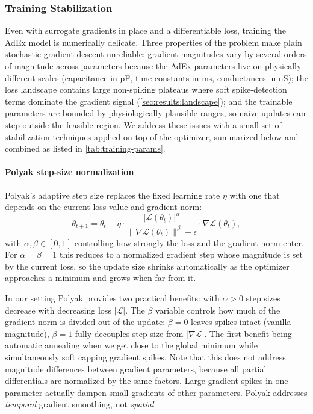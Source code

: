 \subsubsection{Training Stabilization}\label{sec:method:opt:stabilization}
Even with surrogate gradients in place and a differentiable loss, training the \gls{AdEx} model is numerically delicate.
Three properties of the problem make plain stochastic gradient descent unreliable:
gradient magnitudes vary by several orders of magnitude across parameters because the \gls{AdEx} parameters live on physically different scales (capacitance in pF, time constants in ms, conductances in nS);
the loss landscape contains large non-spiking plateaus where soft spike-detection terms dominate the gradient signal (\cref{sec:results:landscape});
and the trainable parameters are bounded by physiologically plausible ranges, so naive updates can step outside the feasible region.
We address these issues with a small set of stabilization techniques applied on top of the optimizer, summarized below and combined as listed in \cref{tab:training-params}.

\paragraph{Polyak step-size normalization}\label{sec:method:opt:stabilization:polyak}
Polyak's adaptive step size \cite{Polyak1964} replaces the fixed learning rate $\eta$ with one that depends on the current loss value and gradient norm:
\begin{equation}
    \theta_{t+1} = \theta_t - \eta \cdot \frac{|\mathcal{L}(\theta_t)|^{\alpha}}{\|\nabla \mathcal{L}(\theta_t)\|^{\beta} + \epsilon} \cdot \nabla \mathcal{L}(\theta_t),
\end{equation}
with $\alpha, \beta \in [0,1]$ controlling how strongly the loss and the gradient norm enter.
For $\alpha = \beta = 1$ this reduces to a normalized gradient step whose magnitude is set by the current loss,
so the update size shrinks automatically as the optimizer approaches a minimum and grows when far from it.

In our setting Polyak provides two practical benefits: with $\alpha > 0$ step sizes decrease with decreasing loss $|\mathcal{L}|$.
The $\beta$ variable controls how much of the gradient norm is divided out of the update:
$\beta=0$ leaves spikes intact (vanilla magnitude), $\beta=1$ fully decouples step size from $|\nabla\mathcal{L}|$.
The first benefit being automatic annealing when we get close to the global minimum while simultaneously soft capping gradient spikes.
Note that this does not address magnitude differences between gradient parameters, because all partial differentials are normalized by the same factors.
Large gradient spikes in one parameter actually dampen small gradients of other parameters.
Polyak addresses \emph{temporal} gradient smoothing, not \emph{spatial}.

